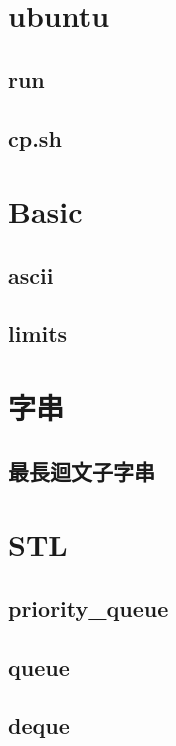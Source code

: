 \section{ubuntu}
    \subsection{run}
        
    \subsection{cp.sh}
        

\section{Basic}
    \subsection{ascii}
        
    \subsection{limits}
        

\section{字串}
    \subsection{最長迴文子字串}
        

\section{STL}
    \subsection{priority\_queue}
        
    \subsection{queue}
        
    \subsection{deque}
        
